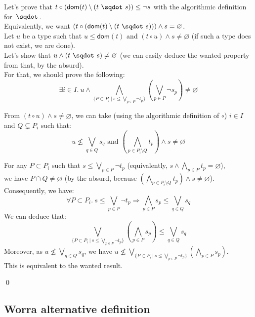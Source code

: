 \documentclass[a4paper]{article}%
\newcommand{\worra}[2]{#1\mathop{\,\sqdot\,} #2}
\newcommand{\apply}[2]{#1\circ#2}
\newcommand{\dom}[1]{\textsf{dom}(#1)}
\newcommand{\alt}{~|~}
\begin{document}
    Let's prove that $\apply t {(\dom t \setminus (\worra t s))} \leq \neg s$ with the algorithmic definition for $\worra {} {}$.\\
    Equivalently, we want $(\apply t {(\dom t \setminus (\worra t s))}) \land s = \varnothing$.\\

    Let $u$ be a type such that $u \leq \dom t$ and $(\apply t u) \land s \neq \varnothing$ (if such a type does not exist, we are done).\\
    Let's show that $u \land (\worra t s) \neq \varnothing$ (we can easily deduce the wanted property from that, by the absurd).\\
    For that, we should prove the following:\\

    \[
        \exists i \in I.\ 
        u \land \bigwedge_{\{P \subset P_i\alt s \leq \bigvee_{p \in P} \neg t_p\}} \left(\bigvee_{p \in P} \neg s_p \right) \neq \varnothing
    \]

  From $(\apply t u) \land s \neq \varnothing$, we can take (using the algorithmic definition of $\circ$) $i \in I$ and $Q \subsetneq P_i$ such that:\\
  \[ u \not\leq\bigvee_{q\in Q}s_q \text{\ \ \ and\ \ \ } (\bigwedge_{p\in P_i\setminus Q}t_p) \land s \neq \varnothing \]

    For any $P \subset P_i$ such that $s \leq \bigvee_{p \in P} \neg t_p$ (equivalently, $s \land \bigwedge_{p \in P} t_p = \varnothing$),\\
    we have $P \cap Q \neq \varnothing$ (by the absurd, because $(\bigwedge_{p\in P_i\setminus Q}t_p) \land s \neq \varnothing$).\\
    Consequently, we have:
    \[ \forall P \subset P_i.\ s \leq \bigvee_{p \in P} \neg t_p \Rightarrow \bigwedge_{p \in P} s_p \leq \bigvee_{q \in Q}s_q \]
    We can deduce that:
    \[ \bigvee_{\{P \subset P_i\alt s \leq \bigvee_{p \in P} \neg t_p\}} \left(\bigwedge_{p \in P} s_p\right) \leq \bigvee_{q \in Q}s_q \]
    Moreover, as $u \not\leq \bigvee_{q\in Q}s_q$, we have $u \not\leq \bigvee_{\{P \subset P_i\alt s \leq \bigvee_{p \in P} \neg t_p\}} \left(\bigwedge_{p \in P} s_p\right)$.\\
    This is equivalent to the wanted result.
        
    \qed
    \pagebreak

    \subsection{Worra alternative definition}
\end{document}
